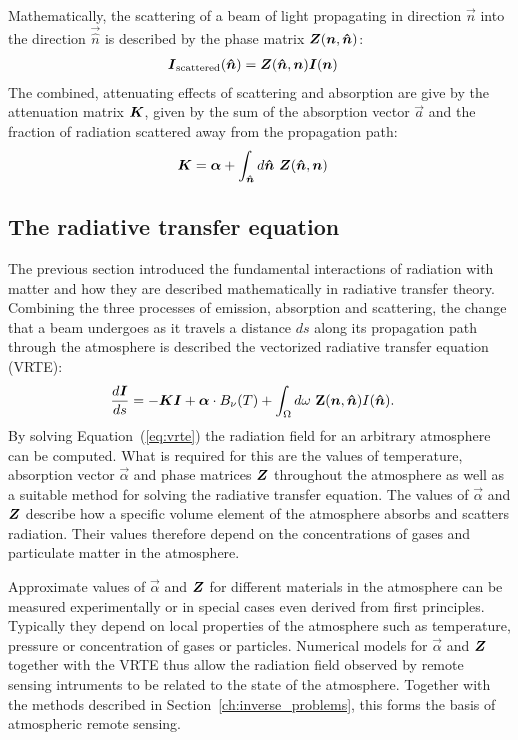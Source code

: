 Mathematically, the scattering of a beam of light propagating in direction
$\vec{n}$ into the direction $\vec{\hat{n}}$ is described by the phase
matrix $\boldsymbol{Z}(\boldsymbol{n}, \boldsymbol{\hat{n}})$:
\begin{align}
  \boldsymbol{I}_\text{scattered}(\boldsymbol{\hat{n}}) &= \boldsymbol{Z}(\boldsymbol{\hat{n}}, \boldsymbol{n}) \boldsymbol{I}(\boldsymbol{n})
\end{align}
The combined, attenuating effects of scattering and absorption are give by
the attenuation matrix $\boldsymbol{K}$, given by the sum of the absorption vector
$\vec{a}$ and the fraction of radiation scattered away from the propagation
path:
\begin{align}
  \vec{K} &= \vec{\alpha} + \int_{\vec{\hat{n}}} d\vec{\hat{n}}\ \mat{Z}(\vec{\hat{n}}, \vec{n})
\end{align}

\subsection{The radiative transfer equation}

The previous section introduced the fundamental interactions of radiation
with matter and how they are described mathematically in radiative transfer
theory. Combining the three processes of emission, absorption and scattering,
the change that a beam undergoes as it travels a distance $ds$ along its
propagation path through the atmosphere is described the vectorized radiative
transfer equation (VRTE):
\begin{align}\label{eq:vrte}
  \frac{d\boldsymbol{I}}{ds} &=
  -\boldsymbol{K}\boldsymbol{I} + \boldsymbol{\alpha} \cdot B_\nu(T) + \int_{\Omega} d\omega \ \mathbf{Z}(\boldsymbol{n}, \boldsymbol{\hat{n}}) I(\boldsymbol{\hat{n}}).
  \end{align}
By solving Equation~(\ref{eq:vrte}) the radiation field for an arbitrary atmosphere can
be computed. What is required for this are the values of temperature, absorption vector
$\vec{\alpha}$ and phase matrices $\boldsymbol{Z}$ throughout the atmosphere as well as a
suitable method for solving the radiative transfer equation. The values of $\vec{\alpha}$
and $\boldsymbol{Z}$ describe how a specific volume element of the atmosphere absorbs and scatters
radiation. Their values therefore depend on the concentrations of gases and particulate
matter in the atmosphere.

Approximate values of $\vec{\alpha}$ and $\boldsymbol{Z}$ for different materials in
the atmosphere can be measured experimentally or in special cases even derived
from first principles. Typically they depend on local properties of the
atmosphere such as temperature, pressure or concentration of gases or particles.
Numerical models for $\vec{\alpha}$ and $\boldsymbol{Z}$ together with the VRTE thus
allow the radiation field observed by remote sensing intruments to be related to
the state of the atmosphere. Together with the methods described in
Section~\ref{ch:inverse_problems}, this forms the basis of atmospheric
remote sensing.

